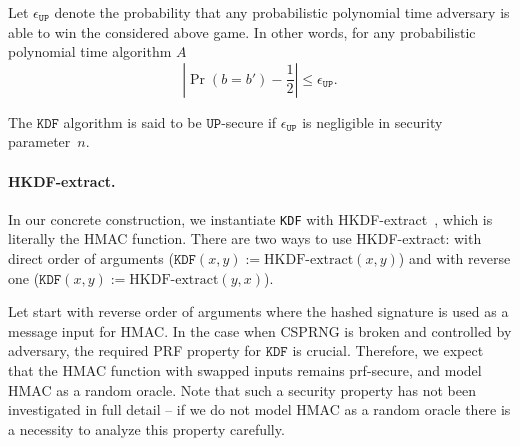 \documentclass{article}
\begin{document}
Let $\epsilon_{\texttt{UP}}$ denote the probability that any probabilistic polynomial time adversary is able to win the considered above game. In other words, for any probabilistic polynomial time algorithm $A$	
$$
\left \vert \Pr(b = b') - \frac{1}{2} \right \vert \le \epsilon_{\texttt{UP}}.
$$

The  $\texttt{KDF}$ algorithm is said to be $\texttt{UP}$-secure if $\epsilon_{\texttt{UP}}$ is negligible in security parameter~$n$.

\paragraph{HKDF-extract.}

In our concrete construction, we instantiate \texttt{KDF} with
HKDF-extract~\cite{krawczyk2010cryptographic}, which is literally the HMAC
function.
  There are two ways to use  HKDF-extract: with direct order of arguments ($\texttt{KDF}(x,y) := \text{HKDF-extract}(x,y)$) and with reverse one ($\texttt{KDF}(x,y) := \text{HKDF-extract}(y,x)$). 

Let start with reverse order of arguments where the hashed signature is used as a message input for HMAC. In the case when CSPRNG is broken and controlled by adversary, the required PRF property for $\texttt{KDF}$ is crucial. Therefore, we expect that the HMAC function with swapped inputs remains prf-secure, and model HMAC as a random oracle. Note that such a security property has not been investigated in full detail --  if we do not model HMAC as a random oracle there is a necessity to analyze this property carefully.
\end{document}
